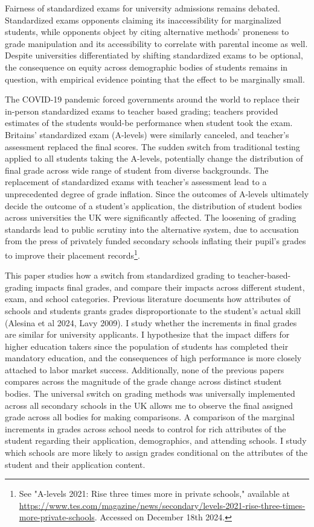 Fairness of standardized exams for university admissions remains debated. Standardized exams opponents claiming its inaccessibility for marginalized students, while opponents object by citing alternative methods' proneness to grade manipulation and its accessibility to correlate with parental income as well. Despite universities differentiated by shifting standardized exams to be optional, the consequence on equity across demographic bodies of students remains in question, with empirical evidence pointing that the effect to be marginally small. 

The COVID-19 pandemic forced governments around the world to replace their in-person standardized exams to teacher based grading; teachers provided estimates of the students would-be performance when student took the exam. Britains' standardized exam (A-levels) were similarly canceled, and teacher's assessment replaced the final scores. The sudden switch from traditional testing applied to all students taking the A-levels, potentially change the distribution of final grade across wide range of student from diverse backgrounds. The replacement of standardized exams with teacher's assessment lead to a unprecedented degree of grade inflation. Since the outcomes of A-levels ultimately decide the outcome of a student's application, the distribution of student bodies across universities the UK were significantly affected. The loosening of grading standards lead to public scrutiny into the alternative system, due to accusation from the press of privately funded secondary schools inflating their pupil's grades to improve their placement records\footnote{See "A-levels 2021: Rise three times more in private schools," available at \url{https://www.tes.com/magazine/news/secondary/levels-2021-rise-three-times-more-private-schools}. Accessed on December 18th 2024.}. 

This paper studies how a switch from standardized grading to teacher-based-grading impacts final grades, and compare their impacts across different student, exam, and school categories. Previous literature documents how attributes of schools and students grants grades disproportionate to the student's actual skill (Alesina et al 2024, Lavy 2009). I study whether the increments in final grades are similar for university applicants. I hypothesize that the impact differs for higher education takers since the population of students has completed their mandatory education, and the consequences of high performance is more closely attached to labor market success. Additionally, none of the previous papers compares across the magnitude of the grade change across distinct student bodies. The universal switch on grading methods was universally implemented across all secondary schools in the UK allows me to observe the final assigned grade across all bodies for making comparisons. A comparison of the marginal increments in grades across school needs to control for rich attributes of the student regarding their application, demographics, and attending schools. I study which schools are more likely to assign grades conditional on the attributes of the student and their application content. 

